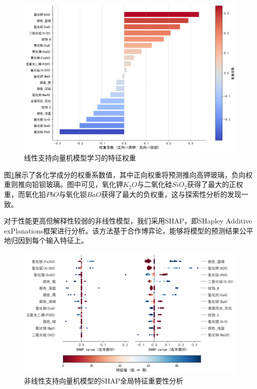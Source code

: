 \begin{figure}[H]
    \centering
    \includegraphics[width=\textwidth]{figs/4问题二/线性SVM特征权重_渐变色.png}
    \caption{线性支持向量机模型学习的特征权重}
    \label{fig:svm_weights}
\end{figure}

图\ref{fig:svm_weights}展示了各化学成分的权重系数值，其中正向权重将预测推向高钾玻璃，负向权重则推向铅钡玻璃。图中可见，氧化钾$K_2O$与二氧化硅$SiO_2$获得了最大的正权重，而氧化铅$PbO$与氧化钡$BaO$获得了最大的负权重，这与探索性分析的发现一致。

对于性能更高但解释性较弱的非线性模型，我们采用SHAP，即SHapley Additive exPlanations框架进行分析。该方法基于合作博弈论，能够将模型的预测结果公平地归因到每个输入特征上。

\begin{figure}[H]
    \centering
    \includegraphics[width=\textwidth]{figs/4问题二/SHAP摘要图_双列_最终版_横置色条.png}
    \caption{非线性支持向量机模型的SHAP全局特征重要性分析}
    \label{fig:shap_summary}
\end{figure}

